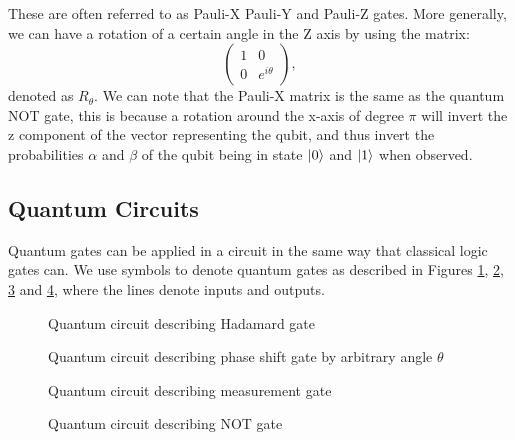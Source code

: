 These are often referred to as Pauli-X Pauli-Y and Pauli-Z gates. More generally, we can have a rotation of a certain angle in the Z axis by using the matrix: $$\begin{pmatrix} 1 & 0 \\ 0 & e^{i\theta} \end{pmatrix},$$ denoted as $R_\theta$. We can note that the Pauli-X matrix is the same as the quantum NOT gate, this is because a rotation around the x-axis of degree $\pi$ will invert the z component of the vector representing the qubit, and thus invert the probabilities $\alpha$ and $\beta$ of the qubit being in state $\ket{0}$ and $\ket{1}$ when observed.
\subsection{Quantum Circuits}
Quantum gates can be applied in a circuit in the same way that classical logic gates can. We use symbols to denote quantum gates as described in Figures \ref{fig:hadamardGate}, \ref{fig:phaseshiftGate}, \ref{fig:measurementGate} and \ref{fig:notGate}, where the lines denote inputs and outputs.
\begin{figure}[!htb]
\centering
\resizebox{2cm}{!}{}
\caption{Quantum circuit describing Hadamard gate}
\label{fig:hadamardGate}
\end{figure}\begin{figure}[!htb]
\centering
\resizebox{2cm}{!}{}
\caption{Quantum circuit describing phase shift gate by arbitrary angle $\theta$}
\label{fig:phaseshiftGate}
\end{figure}\begin{figure}[!htb]
\centering
\resizebox{2cm}{!}{}
\caption{Quantum circuit describing measurement gate}
\label{fig:measurementGate}
\end{figure}\begin{figure}[!htb]
\centering
\resizebox{2cm}{!}{}
\caption{Quantum circuit describing NOT gate}
\label{fig:notGate}
\end{figure}
